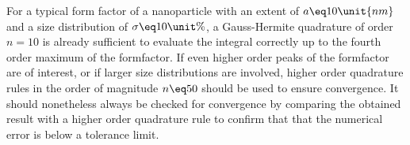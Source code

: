 \documentclass[\main/dresen_thesis.tex]{subfiles}
\begin{document}
  For a typical form factor of a nanoparticle with an extent of $a \eq 10 \unit{nm}$ and a size distribution of $\sigma \eq 10 \unit{\%}$, a Gauss-Hermite quadrature of order $n=10$ is already sufficient to evaluate the integral correctly up to the fourth order maximum of the formfactor.
  If even higher order peaks of the formfactor are of interest, or if larger size distributions are involved, higher order quadrature rules in the order of magnitude $n\eq50$ should be used to ensure convergence.
  It should nonetheless always be checked for convergence by comparing the obtained result with a higher order quadrature rule to confirm that that the numerical error is below a tolerance limit.
\end{document}
